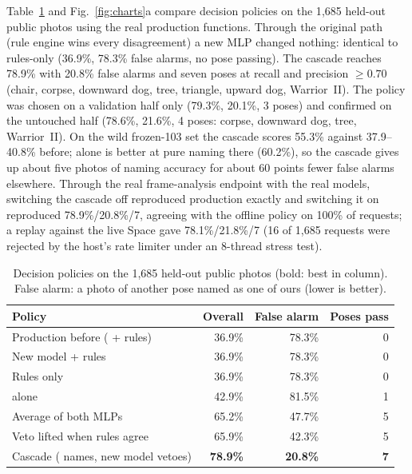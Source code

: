  Table~\ref{tab:policy} and Fig.~\ref{fig:charts}a compare decision policies on the 1{,}685 held-out public photos using the real production functions. Through the original path (rule engine wins every disagreement) a new MLP changed nothing: identical to rules-only (36.9\%, 78.3\% false alarms, no pose passing). The cascade reaches 78.9\% with 20.8\% false alarms and seven poses at recall and precision $\ge0.70$ (chair, corpse, downward dog, tree, triangle, upward dog, Warrior~II). The policy was chosen on a validation half only (79.3\%, 20.1\%, 3 poses) and confirmed on the untouched half (78.6\%, 21.6\%, 4 poses: corpse, downward dog, tree, Warrior~II). On the wild frozen-103 set the cascade scores 55.3\% against 37.9--40.8\% before; \vfour{} alone is better at pure naming there (60.2\%), so the cascade gives up about five photos of naming accuracy for about 60 points fewer false alarms elsewhere. Through the real frame-analysis endpoint with the real models, switching the cascade off reproduced production exactly and switching it on reproduced 78.9\%/20.8\%/7, agreeing with the offline policy on 100\% of requests; a replay against the live Space gave 78.1\%/21.8\%/7 (16 of 1{,}685 requests were rejected by the host's rate limiter under an 8-thread stress test).
\begin{table}[t]
\centering\footnotesize\setlength{\tabcolsep}{4pt}
\caption{Decision policies on the 1{,}685 held-out public photos (bold: best in column). False alarm: a photo of another pose named as one of ours (lower is better).}\label{tab:policy}
\begin{tabular}{@{}lrrr@{}}
\toprule
Policy & Overall & False alarm & Poses pass \\ \midrule
Production before (\vfour{} + rules) & 36.9\% & 78.3\% & 0 \\
New model + rules & 36.9\% & 78.3\% & 0 \\
Rules only & 36.9\% & 78.3\% & 0 \\
\vfour{} alone & 42.9\% & 81.5\% & 1 \\
Average of both MLPs & 65.2\% & 47.7\% & 5 \\
Veto lifted when rules agree & 65.9\% & 42.3\% & 5 \\
Cascade (\vfour{} names, new model vetoes) & \textbf{78.9\%} & \textbf{20.8\%} & \textbf{7} \\ \bottomrule
\end{tabular}
\end{table}

